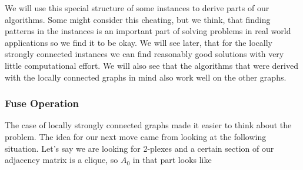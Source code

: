 We will use this special structure of some instances to derive parts of our algorithms. Some might consider 
this cheating, but we think, that finding patterns in the instances is an important part of solving problems 
in real world applications so we find it to be okay. We will see later, that for the locally strongly connected 
instances we can find reasonably good solutions with very little computational effort. We will also see that 
the algorithms that were derived with the locally connected graphs in mind also work well on the other graphs.\\

\pagebreak

\subsubsection{Fuse Operation}
The case of locally strongly connected graphs made it easier to think about the problem. The idea for our next move came 
from looking at the following situation. Let's say we are looking for 2-plexes and a certain section of our adjacency 
matrix is a clique, so $A_0$ in that part looks like\\

